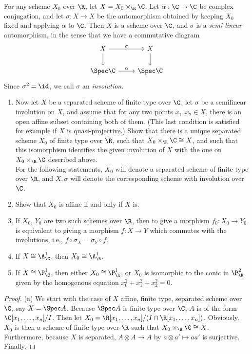 \begin{exercise}
	For any scheme $X_0$ over $\R $, let $X = X_0 \times_{\R} \C$. Let $\alpha:\C\to\C$ be complex conjugation, and let $\sigma: X \to X$ be the automorphism obtained by keeping $X_0$ fixed and applying $\alpha$ to $\C $. Then $X$ is a scheme over $\C$, and $\sigma$ is a \textit{semi-linear} automorphism, in the sense that we have a commutative diagram
	\[
	\begin{tikzcd}
	X & X\\
	\Spec \C & \Spec \C
	\arrow["\sigma",from=1-1,to=1-2]
	\arrow[from=1-1,to=2-1]
	\arrow["\alpha",from=2-1,to=2-2]
	\arrow[from=1-2,to=2-2]
	\end{tikzcd}
	\]
	Since $\sigma^2 = \id$, we call $\sigma$ an \textit{involution}.
	\begin{enumerate}
		\item Now let $X$ be a separated scheme of finite type over $\C$, let $\sigma$ be a semilinear involution on $X$, and assume that for any two points $x_{1},x_{2}\in X $, there is an open affine subset containing both of them. (This last condition is satisfied for example if $X$ is quasi-projective.) Show that there is a unique separated scheme $X_0$ of finite type over $\R$, such that $X_0 \times _{\R} \C \cong X$, and such that this isomorphism identifies the given involution of $X$ with the one on $X_0 \times _{\R} \C$ described above.\\
		For the following statements, $X_0$ will denote a separated scheme of finite type over $\R$, and $X,\sigma$ will denote the corresponding scheme with involution over $\C$.
		\item Show that $X_0$ is affine if and only if $X$ is.
		\item If $X_0$, $Y_{0} $ are two such schemes over $\R$, then to give a morphism $f_{0}:X_{0}\to Y_{0} $ is equivalent to giving a morphism $f:X \to Y$ which commutes with the involutions, i.e., $f \circ \sigma_X = \sigma_Y \circ f $.
		\item If $X \cong \A_{\C}^1 $, then $X_{0} \cong \A_{\R}^1 $.
		\item If $X\cong \P_{\C}^1 $, then either $X_{0} \cong \P_{\R}^1 $, or $X_{0} $ is isomorphic to the conic in $\P_{\R}^2 $ given by the homogenous equation $x_{0}^2+x_{1}^2+x_{2}^2=0 $.
\end{enumerate}
\end{exercise}
\begin{proof}
	(a) We start with the case of $X $ affine, finite type, separated scheme over $\C $, say $X= \Spec A $.
	Because $\Spec A $ is finite type over $\C $, $A $ is of the form $\C[x_{1},\ldots,x_n] / I $.
	Then let $X_{0} = \R[x_{1},\ldots,x_n] / (I\cap \R[x_{1},\ldots,x_n]) $.
	Obviously, $X_{0} $ is then a scheme of finite type over $\R $ such that $X_{0} \times _{\R} \C \cong X $.
	Furthermore, because $X $ is separated, $A \otimes A \to A $ by $a \otimes a' \mapsto aa' $ is surjective.
	Finally,
\end{proof}

